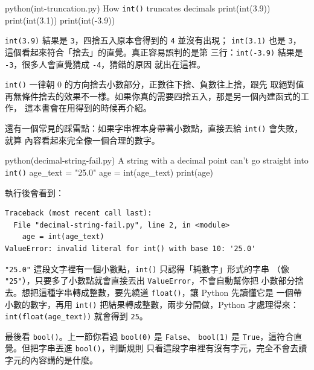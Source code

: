 \begin{example}{python}{(int-truncation.py) How \texttt{int()} truncates decimals}
print(int(3.9))
print(int(3.1))
print(int(-3.9))
\end{example}


\texttt{int(3.9)} 結果是 \texttt{3}，四捨五入原本會得到的 \texttt{4} 並沒有出現；
\texttt{int(3.1)} 也是 \texttt{3}，這個看起來符合「捨去」的直覺。真正容易誤判的是第
三行：\texttt{int(-3.9)} 結果是 \texttt{-3}，很多人會直覺猜成 \texttt{-4}，猜錯的原因
就出在這裡。

\texttt{int()} 一律朝 0 的方向捨去小數部分，正數往下捨、負數往上捨，跟先
取絕對值再無條件捨去的效果不一樣。如果你真的需要四捨五入，那是另一個內建函式的工作，
這本書會在用得到的時候再介紹。


還有一個常見的踩雷點：如果字串裡本身帶著小數點，直接丟給 \texttt{int()} 會失敗，就算
內容看起來完全像一個合理的數字。

\begin{example}{python}{(decimal-string-fail.py) A string with a decimal point can't go straight into \texttt{int()}}
age_text = "25.0"
age = int(age_text)
print(age)
\end{example}

執行後會看到：

\begin{verbatim}
Traceback (most recent call last):
  File "decimal-string-fail.py", line 2, in <module>
    age = int(age_text)
ValueError: invalid literal for int() with base 10: '25.0'
\end{verbatim}

\texttt{"25.0"} 這段文字裡有一個小數點，\texttt{int()} 只認得「純數字」形式的字串
（像 \texttt{"25"}），只要多了小數點就會直接丟出 \texttt{ValueError}，不會自動幫你把
小數部分捨去。想把這種字串轉成整數，要先繞道 \texttt{float()}，讓 Python 先讀懂它是
一個帶小數的數字，再用 \texttt{int()} 把結果轉成整數，兩步分開做，Python 才處理得來：
\texttt{int(float(age\_text))} 就會得到 \texttt{25}。

最後看 \texttt{bool()}。上一節你看過 \texttt{bool(0)} 是 \texttt{False}、
\texttt{bool(1)} 是 \texttt{True}，這符合直覺。但把字串丟進 \texttt{bool()}，判斷規則
只看這段字串裡有沒有字元，完全不會去讀字元的內容講的是什麼。

